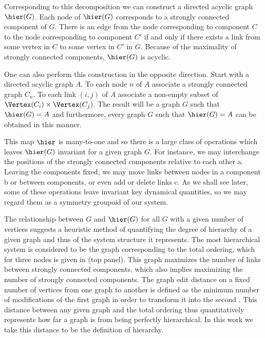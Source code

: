 Corresponding to this decomposition we can construct a directed acyclic graph $\hier (G)$.  Each node of $\hier (G)$ corresponds to a strongly connected component of $G$. There is an edge from the node corresponding to component $C$ to the node corresponding to component $C'$ if and only if there exists a link from some vertex in $C$ to some vertex in $C'$ in $G$.  Because of the maximality of strongly connected components, $\hier (G)$ is acyclic.

One can also perform this construction in the opposite direction.  Start with a directed acyclic graph $A$.  To each node $n$ of $A$ associate
a strongly connected graph $C_n$.  To each link $(i,j)$ of $A$ associate a non-empty subset of $\Vertex(C_i) \times \Vertex(C_j)$.  The result will be a graph $G$ such that $\hier(G) = A$ and furthermore, every graph $G$ such that $\hier(G) = A$ can be obtained in this manner.

This map $\hier$ is many-to-one and so there is a large class of
operations which leaves $\hier(G)$ invariant for a given graph $G$.
For instance, we may interchange the positions of the strongly
connected components relative to each other  a.  Leaving the components fixed, we may move links between nodes in a component  b or between components, or even add or delete links  c.  As we shall see later, some of these operations leave invariant key dynamical quantities, so we may regard them as a symmetry groupoid of our system.

The relationship between $G$ and $\hier(G)$ for all $G$ with a given number of vertices suggests a heuristic method of quantifying the degree of hierarchy of a given graph and thus of the system structure it represents. The most hierarchical system is considered to be the graph corresponding to the total ordering, which for three nodes is given in  (top panel). This graph maximizes the number of links between strongly connected components, which also implies maximizing the number of strongly connected components. The graph edit distance on a fixed number of vertices from one graph to another is defined as the minimum number of modifications of the first graph in order to transform it into the second \cite{Axenovich2011}. This distance between any given graph and the total ordering thus quantitatively represents how far a graph is from being perfectly hierarchical. In this work we take this distance to be the definition of hierarchy.

